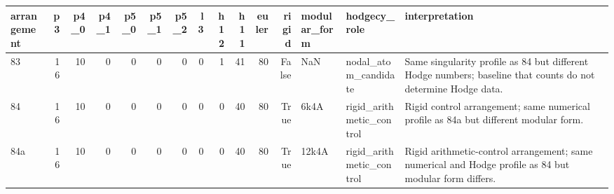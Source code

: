 \begin{tabular}{lrrrrrrrrrrrlll}
\toprule
arrangement & p3 & p4_0 & p4_1 & p5_0 & p5_1 & p5_2 & l3 & h12 & h11 & euler & rigid & modular_form & hodgecy_role & interpretation \\
\midrule
83 & 16 & 10 & 0 & 0 & 0 & 0 & 0 & 1 & 41 & 80 & False & NaN & nodal_atom_candidate & Same singularity profile as 84 but different Hodge numbers; baseline that counts do not determine Hodge data. \\
84 & 16 & 10 & 0 & 0 & 0 & 0 & 0 & 0 & 40 & 80 & True & 6k4A & rigid_arithmetic_control & Rigid control arrangement; same numerical profile as 84a but different modular form. \\
84a & 16 & 10 & 0 & 0 & 0 & 0 & 0 & 0 & 40 & 80 & True & 12k4A & rigid_arithmetic_control & Rigid arithmetic-control arrangement; same numerical and Hodge profile as 84 but modular form differs. \\
\bottomrule
\end{tabular}

